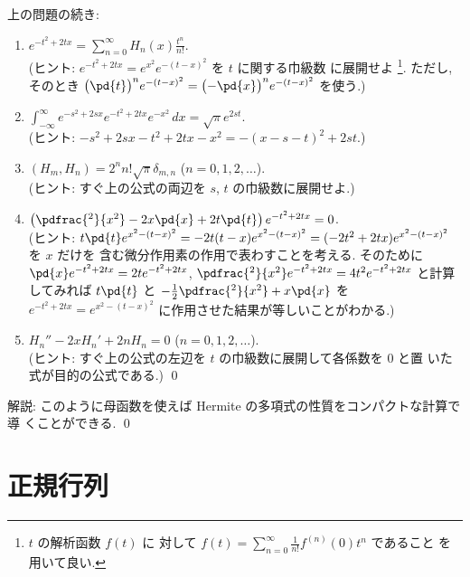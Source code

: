 \documentclass[12pt,twoside]{jarticle}
\begin{document}

\begin{question}
  上の問題の続き:
  \begin{enumerate}
  \item $\displaystyle e^{-t^2+2tx} = \sum_{n=0}^\infty H_n(x)\frac{t^n}{n!}$.
    \\(ヒント: $e^{-t^2+2tx} = e^{x^2} e^{-(t-x)^2}$ を $t$ に関する巾級数
    に展開せよ%
    \footnote{$t$ の解析函数 $f(t)$ に
      対して $f(t) = \sum_{n=0}^\infty \frac{1}{n!}f^{(n)}(0)t^n$ であること
      を用いて良い.}.
    ただし, そのとき $\bigl(\pd{t}\bigr)^n e^{-(t-x)^2}
    =\bigl(-\pd{x}\bigr)^n e^{-(t-x)^2}$ を使う.)
  \item $\int_{-\infty}^\infty e^{-s^2+2sx}e^{-t^2+2tx}e^{-x^2}\,dx
    = \sqrt{\pi} e^{2st}.$ 
    \\(ヒント: $-s^2+2sx-t^2+2tx-x^2 = - (x-s-t)^2 + 2st$.)
  \item $(H_m, H_n)=2^n n!\sqrt{\pi} \delta_{m,n}$ \quad ($n=0,1,2,\ldots$).
    \\(ヒント: すぐ上の公式の両辺を $s$, $t$ の巾級数に展開せよ.)
  \item $\left(\pdfrac{^2}{x^2} - 2x \pd{x} + 2t \pd{t}\right)e^{-t^2+2tx}=0$.
    \\(ヒント: $t\pd{t}e^{x^2-(t-x)^2}
    = -2t(t-x)e^{x^2-(t-x)^2} = (-2t^2+2tx)e^{x^2-(t-x)^2}$ を $x$ だけを
    含む微分作用素の作用で表わすことを考える.
    そのために $\pd{x}e^{-t^2+2tx} = 2t e^{-t^2+2tx}$, 
    $\pdfrac{^2}{x^2}e^{-t^2+2tx} = 4t^2 e^{-t^2+2tx}$ 
    と計算してみれば $t\pd{t}$ と $-\frac{1}{2}\pdfrac{^2}{x^2}+x\pd{x}$ 
    を $e^{-t^2+2tx}=e^{x^2-(t-x)^2}$ に作用させた結果が等しいことがわかる.)
  \item $H_n'' - 2 x H_n' + 2n H_n = 0$ \quad ($n=0,1,2,\ldots$).
    \\(ヒント: すぐ上の公式の左辺を $t$ の巾級数に展開して各係数を $0$ と置
    いた式が目的の公式である.)
    \qed
  \end{enumerate}
\end{question}

\noindent
解説: このように母函数を使えば Hermite の多項式の性質をコンパクトな計算で導
くことができる. 
\qed


\section{正規行列}
\label{sec:normal-matrix}
\end{document}
